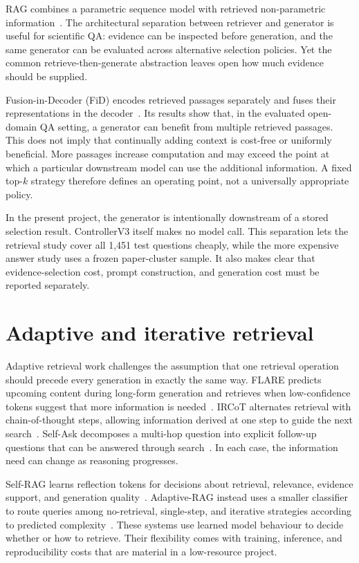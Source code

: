 RAG combines a parametric sequence model with retrieved non-parametric information~\cite{lewis2020rag}. The architectural separation between retriever and generator is useful for scientific QA: evidence can be inspected before generation, and the same generator can be evaluated across alternative selection policies. Yet the common retrieve-then-generate abstraction leaves open how much evidence should be supplied.

Fusion-in-Decoder (FiD) encodes retrieved passages separately and fuses their representations in the decoder~\cite{izacard2021fid}. Its results show that, in the evaluated open-domain QA setting, a generator can benefit from multiple retrieved passages. This does not imply that continually adding context is cost-free or uniformly beneficial. More passages increase computation and may exceed the point at which a particular downstream model can use the additional information. A fixed top-$k$ strategy therefore defines an operating point, not a universally appropriate policy.

In the present project, the generator is intentionally downstream of a stored selection result. ControllerV3 itself makes no model call. This separation lets the retrieval study cover all 1,451 test questions cheaply, while the more expensive answer study uses a frozen paper-cluster sample. It also makes clear that evidence-selection cost, prompt construction, and generation cost must be reported separately.

\section{Adaptive and iterative retrieval}

Adaptive retrieval work challenges the assumption that one retrieval operation should precede every generation in exactly the same way. FLARE predicts upcoming content during long-form generation and retrieves when low-confidence tokens suggest that more information is needed~\cite{jiang2023flare}. IRCoT alternates retrieval with chain-of-thought steps, allowing information derived at one step to guide the next search~\cite{trivedi2023ircot}. Self-Ask decomposes a multi-hop question into explicit follow-up questions that can be answered through search~\cite{press2023selfask}. In each case, the information need can change as reasoning progresses.

Self-RAG learns reflection tokens for decisions about retrieval, relevance, evidence support, and generation quality~\cite{asai2024selfrag}. Adaptive-RAG instead uses a smaller classifier to route queries among no-retrieval, single-step, and iterative strategies according to predicted complexity~\cite{jeong2024adaptiverag}. These systems use learned model behaviour to decide whether or how to retrieve. Their flexibility comes with training, inference, and reproducibility costs that are material in a low-resource project.

